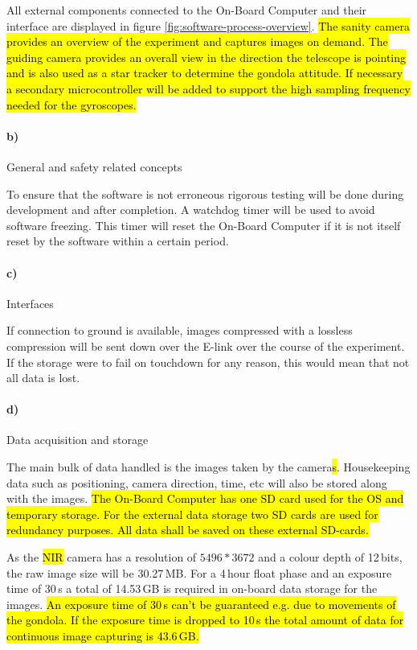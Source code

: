 All external components connected to the On-Board Computer and their interface are displayed in figure \ref{fig:software-process-overview}. \hl{The sanity camera provides an overview of the experiment and captures images on demand. The guiding camera provides an overall view in the direction the telescope is pointing and is also used as a star tracker to determine the gondola attitude. If necessary a secondary microcontroller will be added to support the high sampling frequency needed for the gyroscopes.}

\paragraph{b)} General and safety related concepts

To ensure that the software is not erroneous rigorous testing will be done during development and after completion. A watchdog timer will be used to avoid software freezing. This timer will reset the On-Board Computer if it is not itself reset by the software within a certain period.

\paragraph{c)} Interfaces

If connection to ground is available, images compressed with a lossless compression will be sent down over the E-link over the course of the experiment. If the storage were to fail on touchdown for any reason, this would mean that not all data is lost.



\paragraph{d)} Data acquisition and storage

The main bulk of data handled is the images taken by the camera\hl{s}. Housekeeping data such as positioning, camera direction, time, etc will also be stored along with the images. \hl{The On-Board Computer has one SD card used for the OS and temporary storage. For the external data storage two SD cards are used for redundancy purposes. All data shall be saved on these external SD-cards.}

As the \hl{NIR} camera has a resolution of $5496 * 3672$ and a colour depth of 12\,bits, the raw image size will be 30.27\,MB. For a 4\,hour float phase and an exposure time of 30\,s a total of  14.53\,GB is required in on-board data storage for the images. \hl{An exposure time of 30\,s can't be guaranteed e.g. due to movements of the gondola. If the exposure time is dropped to 10\,s the total amount of data for continuous image capturing is  43.6\,GB.}

